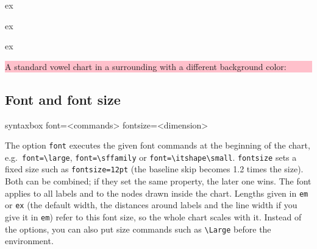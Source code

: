 \documentclass[a4paper,11pt]{article}
\newcommand\cmd[1]{\texttt{\textbackslash #1}}
\newcommand\opt[1]{\texttt{#1}}
\begin{document}
\begin{tcblisting}{ex}
\begin{vowelchart}[bg=lightgray, bgmargin=3pt, width=3cm]
  {\color{red}
  }
\end{vowelchart}
\end{tcblisting}

\begin{tcblisting}{ex}
\begin{vowelchart}[fg=blue!50!black, bg=cyan!15, bgmargin=0.5cm, width=2.5cm]
\end{vowelchart}
\end{tcblisting}

\begin{tcblisting}{ex}
\colorbox{pink}{%
  \begin{minipage}{5cm}
    \small A standard vowel chart in a surrounding with a different background color: \medskip \\
    \begin{vowelchart}[width=2cm, bgmargin=5pt]
      \color{blue}
    \end{vowelchart}
  \end{minipage}
}
\end{tcblisting}




\subsection{Font and font size} \label{sec:font}

\begin{tcblisting}{syntaxbox}
font=<commands>          fontsize=<dimension>
\end{tcblisting}

\noindent
The option \opt{font} executes the given font commands at the beginning of the chart, e.g.\ \opt{font=\textbackslash large}, \opt{font=\textbackslash sffamily} or \opt{font=\textbackslash itshape\textbackslash small}. \opt{fontsize} sets a fixed size such as \opt{fontsize=12pt} (the baseline skip becomes 1.2 times the size). Both can be combined; if they set the same property, the later one wins. The font applies to all labels and to the nodes drawn inside the chart. Lengths given in \texttt{em} or \texttt{ex} (the default width, the distances around labels and the line width if you give it in \texttt{em}) refer to this font size, so the whole chart scales with it. Instead of the options, you can also put size commands such as \cmd{Large} before the environment.
\end{document}

